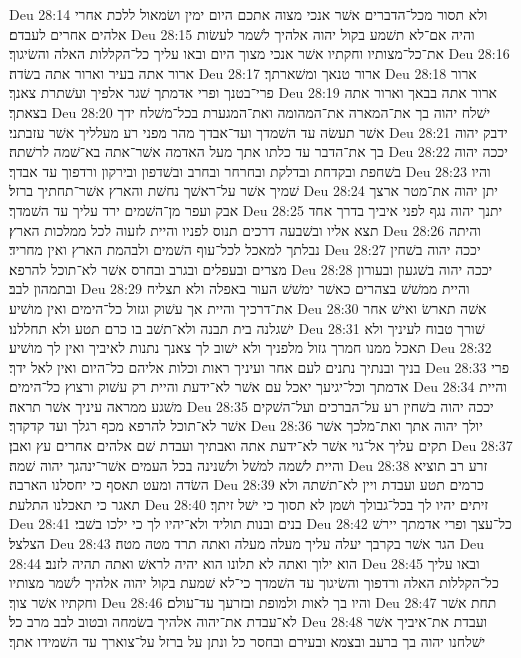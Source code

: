 Deu 28:14  ולא תסור מכל־הדברים אשׁר אנכי מצוה אתכם היום ימין ושׂמאול ללכת אחרי אלהים אחרים לעבדם׃
Deu 28:15  והיה אם־לא תשׁמע בקול יהוה אלהיך לשׁמר לעשׂות את־כל־מצותיו וחקתיו אשׁר אנכי מצוך היום ובאו עליך כל־הקללות האלה והשׂיגוך׃
Deu 28:16  ארור אתה בעיר וארור אתה בשׂדה׃
Deu 28:17  ארור טנאך ומשׁארתך׃
Deu 28:18  ארור פרי־בטנך ופרי אדמתך שׁגר אלפיך ועשׁתרת צאנך׃
Deu 28:19  ארור אתה בבאך וארור אתה בצאתך׃
Deu 28:20  ישׁלח יהוה בך את־המארה את־המהומה ואת־המגערת בכל־משׁלח ידך אשׁר תעשׂה עד השׁמדך ועד־אבדך מהר מפני רע מעלליך אשׁר עזבתני׃
Deu 28:21  ידבק יהוה בך את־הדבר עד כלתו אתך מעל האדמה אשׁר־אתה בא־שׁמה לרשׁתה׃
Deu 28:22  יככה יהוה בשׁחפת ובקדחת ובדלקת ובחרחר ובחרב ובשׁדפון ובירקון ורדפוך עד אבדך׃
Deu 28:23  והיו שׁמיך אשׁר על־ראשׁך נחשׁת והארץ אשׁר־תחתיך ברזל׃
Deu 28:24  יתן יהוה את־מטר ארצך אבק ועפר מן־השׁמים ירד עליך עד השׁמדך׃
Deu 28:25  יתנך יהוה נגף לפני איביך בדרך אחד תצא אליו ובשׁבעה דרכים תנוס לפניו והיית לזעוה לכל ממלכות הארץ׃
Deu 28:26  והיתה נבלתך למאכל לכל־עוף השׁמים ולבהמת הארץ ואין מחריד׃
Deu 28:27  יככה יהוה בשׁחין מצרים ובעפלים ובגרב ובחרס אשׁר לא־תוכל להרפא׃
Deu 28:28  יככה יהוה בשׁגעון ובעורון ובתמהון לבב׃
Deu 28:29  והיית ממשׁשׁ בצהרים כאשׁר ימשׁשׁ העור באפלה ולא תצליח את־דרכיך והיית אך עשׁוק וגזול כל־הימים ואין מושׁיע׃
Deu 28:30  אשׁה תארשׂ ואישׁ אחר ישׁגלנה בית תבנה ולא־תשׁב בו כרם תטע ולא תחללנו׃
Deu 28:31  שׁורך טבוח לעיניך ולא תאכל ממנו חמרך גזול מלפניך ולא ישׁוב לך צאנך נתנות לאיביך ואין לך מושׁיע׃
Deu 28:32  בניך ובנתיך נתנים לעם אחר ועיניך ראות וכלות אליהם כל־היום ואין לאל ידך׃
Deu 28:33  פרי אדמתך וכל־יגיעך יאכל עם אשׁר לא־ידעת והיית רק עשׁוק ורצוץ כל־הימים׃
Deu 28:34  והיית משׁגע ממראה עיניך אשׁר תראה׃
Deu 28:35  יככה יהוה בשׁחין רע על־הברכים ועל־השׁקים אשׁר לא־תוכל להרפא מכף רגלך ועד קדקדך׃
Deu 28:36  יולך יהוה אתך ואת־מלכך אשׁר תקים עליך אל־גוי אשׁר לא־ידעת אתה ואבתיך ועבדת שׁם אלהים אחרים עץ ואבן׃
Deu 28:37  והיית לשׁמה למשׁל ולשׁנינה בכל העמים אשׁר־ינהגך יהוה שׁמה׃
Deu 28:38  זרע רב תוציא השׂדה ומעט תאסף כי יחסלנו הארבה׃
Deu 28:39  כרמים תטע ועבדת ויין לא־תשׁתה ולא תאגר כי תאכלנו התלעת׃
Deu 28:40  זיתים יהיו לך בכל־גבולך ושׁמן לא תסוך כי ישׁל זיתך׃
Deu 28:41  בנים ובנות תוליד ולא־יהיו לך כי ילכו בשׁבי׃
Deu 28:42  כל־עצך ופרי אדמתך יירשׁ הצלצל׃
Deu 28:43  הגר אשׁר בקרבך יעלה עליך מעלה מעלה ואתה תרד מטה מטה׃
Deu 28:44  הוא ילוך ואתה לא תלונו הוא יהיה לראשׁ ואתה תהיה לזנב׃
Deu 28:45  ובאו עליך כל־הקללות האלה ורדפוך והשׂיגוך עד השׁמדך כי־לא שׁמעת בקול יהוה אלהיך לשׁמר מצותיו וחקתיו אשׁר צוך׃
Deu 28:46  והיו בך לאות ולמופת ובזרעך עד־עולם׃
Deu 28:47  תחת אשׁר לא־עבדת את־יהוה אלהיך בשׂמחה ובטוב לבב מרב כל׃
Deu 28:48  ועבדת את־איביך אשׁר ישׁלחנו יהוה בך ברעב ובצמא ובעירם ובחסר כל ונתן על ברזל על־צוארך עד השׁמידו אתך׃
